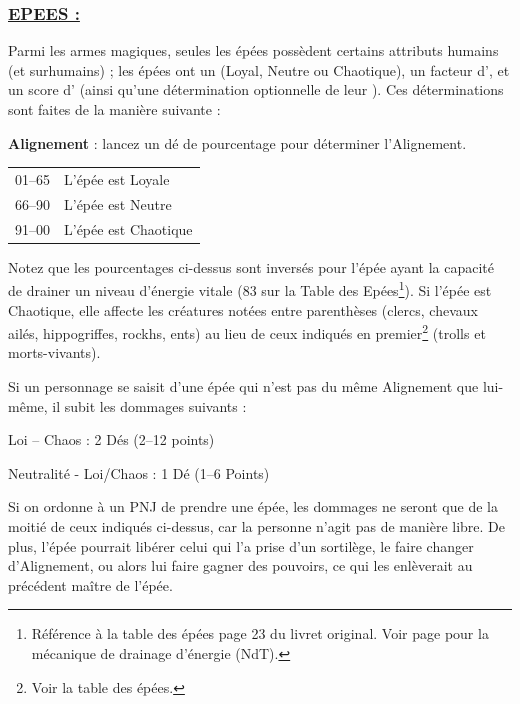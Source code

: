 \subsubsection*{\uline{EPEES :}}
\label{objet-epees}
{\parindent0pt

Parmi les armes magiques, seules les épées possèdent certains attributs humains (et surhumains) ; les épées ont un  (Loyal, Neutre ou Chaotique), un facteur d', et un score d' (ainsi qu'une détermination optionnelle de leur ). Ces déterminations sont faites de la manière suivante :

\bigskip

\textbf{Alignement} : lancez un dé de pourcentage pour déterminer l'Alignement.

\bigskip

{\parindent2.5cm
\begin{tabular}{p{2.5cm}l}
01--65  & L'épée est Loyale \\
66--90  & L'épée est Neutre \\
91--00  & L'épée est Chaotique \\
\end{tabular}}

\bigskip

Notez que les pourcentages ci-dessus sont inversés pour l'épée ayant la capacité de drainer un niveau d'énergie vitale (83 sur la Table des Epées\footnote{Référence à la table des épées page 23 du livret original. Voir page \pageref{monstre-necrophage} pour la mécanique de drainage d'énergie (NdT).}). Si l'épée est Chaotique, elle affecte les créatures notées entre parenthèses (clercs, chevaux ailés, hippogriffes, rockhs, ents) au lieu de ceux indiqués en premier\footnote{Voir la table des épées.} (trolls et morts-vivants).

\bigskip

Si un personnage se saisit d'une épée qui n'est pas du même Alignement que lui-même, il subit les dommages suivants :

\bigskip

{\parindent2cm Loi -- Chaos : 2 Dés (2--12 points)

Neutralité - Loi/Chaos : 1 Dé (1--6 Points)}

\bigskip

Si on ordonne à un PNJ de prendre une épée, les dommages ne seront que de la moitié de ceux indiqués ci-dessus, car la personne n'agit pas de manière libre. De plus, l'épée pourrait libérer celui qui l'a prise d'un sortilège, le faire changer d'Alignement, ou alors lui faire gagner des pouvoirs, ce qui les enlèverait au précédent maître de l'épée.

}
